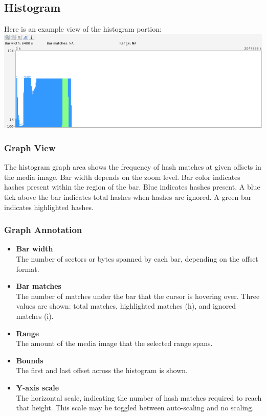 \documentclass[11pt,fleqn]{article} %
\begin{document}
\subsection{Histogram}
Here is an example view of the histogram portion:\\
\includegraphics[scale=.4]{screenshots/histogram}\\

\subsubsection{Graph View}
The histogram graph area shows the frequency of hash matches at given offsets in the media image. Bar width depends on the zoom level. Bar color indicates hashes present within the region of the bar. Blue indicates hashes present. A blue tick above the bar indicates total hashes when hashes are ignored. A green bar indicates highlighted hashes.\\

\subsubsection{Graph Annotation}
\begin{itemize}
\item \textbf{Bar width}\\
The number of sectors or bytes spanned by each bar, depending on the offset format.
\item \textbf{Bar matches}\\
The number of matches under the bar that the cursor is hovering over.  Three values are shown: total matches, highlighted matches (h), and ignored matches (i).
\item \textbf{Range}\\
The amount of the media image that the selected range spans.
\item \textbf{Bounds}\\
The first and last offset across the histogram is shown.
\item \textbf{Y-axis scale}\\
The horizontal scale, indicating the number of hash matches required to reach that height. This scale may be toggled between auto-scaling and no scaling.
\end{itemize}
\end{document}
